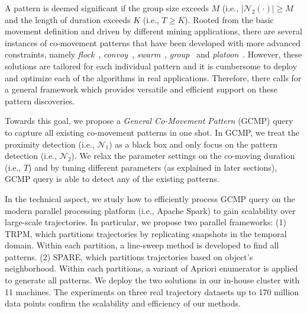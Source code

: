 A pattern is deemed significant if the group size exceeds $M$ (i.e., $|\mathcal{N}_2(\cdot)| \geq M$ and the length of duration exceeds $K$ (i.e., $T \geq K$). 
%
%
Rooted from the basic movement definition and driven by different mining applications, there are several instances of co-movement patterns that have been developed with more advanced constraints, namely \emph{flock}~\cite{gudmundsson2006computing}, \emph{convoy}~\cite{jeung2008discovery}, \emph{swarm}~\cite{li2010swarm}, 
\emph{group}~\cite{wang2006grouppattern} and \emph{platoon}~\cite{li2015platoon}. 
However, these solutions are tailored for each individual pattern and it is cumbersome to deploy and optimize each of the algorithms in real applications. Therefore, there 
calls for a general framework which provides versatile and efficient support on these pattern discoveries. 


Towards this goal, we propose a \emph{General Co-Movement Pattern} (GCMP)
query to capture all existing co-movement patterns in one shot. In GCMP, we treat the proximity detection (i.e., $\mathcal{N}_1$) as
a black box and only focus on the pattern detection (i.e., $\mathcal{N}_2$). We relax the parameter settings on the
co-moving duration (i.e., $T$) and by tuning different parameters (as explained in later sections), GCMP
query is able to detect any of the existing patterns.
%



In the technical aspect, we study how to efficiently process GCMP query 
on the modern parallel processing platform (i.e., Apache Spark) to
gain scalability over large-scale trajectories. 
In particular, we propose two parallel frameworks: (1) TRPM, which partitions trajectories by replicating snapshots in the temporal domain. Within each partition, a line-sweep method is developed to find all patterns. 
(2) SPARE, which partitions trajectories based on object's neighborhood. Within each partitions, a variant of Apriori enumerator is applied to generate all patterns. 
We deploy the two solutions in our in-house cluster with 11 machines. The experiments on three
real trajectory datasets up to 170 million data points confirm the scalability and efficiency 
of our methods.
%
